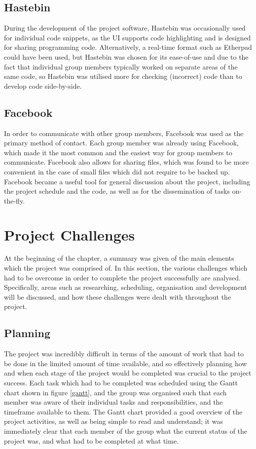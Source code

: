 \subsection{Hastebin}
During the development of the project software, Hastebin was occasionally used for individual code snippets, as the UI supports code highlighting and is designed for sharing programming code. Alternatively, a real-time format such as Etherpad could have been used, but Hastebin was chosen for its ease-of-use and due to the fact that individual group members typically worked on separate areas of the same code, so Hastebin was utilised more for checking (incorrect) code than to develop code side-by-side.

\subsection{Facebook}
In order to communicate with other group members, Facebook was used as the primary method of contact. Each group member was already using Facebook, which made it the most common and the easiest way for group members to communicate. Facebook also allows for sharing files, which was found to be more convenient in the case of small files which did not require to be backed up. Facebook became a useful tool for general discussion about the project, including the project schedule and the code, as well as for the dissemination of tasks on-the-fly.

\section{Project Challenges}
At the beginning of the chapter, a summary was given of the main elements which the project was comprised of. In this section, the various challenges which had to be overcome in order to complete the project successfully are analysed. Specifically, areas such as researching, scheduling, organisation and development will be discussed, and how these challenges were dealt with throughout the project. 

\subsection{Planning}
The project was incredibly difficult in terms of the amount of work that had to be done in the limited amount of time available, and so effectively planning how and when each stage of the project would be completed was crucial to the project success. Each task which had to be completed was scheduled using the Gantt chart shown in figure \ref{gantt}, and the group was organised such that each member was aware of their individual tasks and responsibilities, and the timeframe available to them. The Gantt chart provided a good overview of the project activities, as well as being simple to read and understand; it was immediately clear that each member of the group what the current status of the project was, and what had to be completed at what time.

